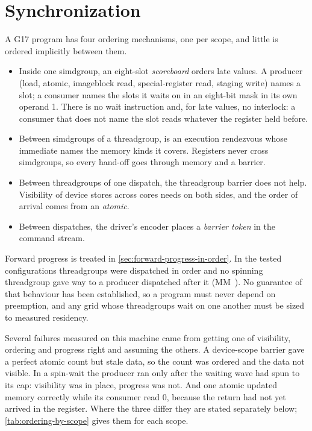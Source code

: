 \chapter{Synchronization}\label{ch:synchronization}

A G17 program has four ordering mechanisms, one per scope, and little is ordered implicitly between them.

\begin{itemize}
\item Inside one simdgroup, an eight-slot \emph{scoreboard} orders late values. A producer (load, atomic, imageblock read,
  special-register read, staging write) names a slot; a consumer names the slots it waits on in an eight-bit mask in
  its own operand 1. There is no wait instruction and, for late values, no interlock: a consumer that does not name the
  slot reads whatever the register held before.
\item Between simdgroups of a threadgroup, \emph{} is an execution rendezvous whose immediate names
  the memory kinds it covers. Registers never cross simdgroups, so every hand-off goes through memory and a barrier.
\item Between threadgroups of one dispatch, the threadgroup barrier does not help. Visibility of device stores
  across cores needs \emph{} on both sides, and the order of arrival comes from an \emph{atomic}.
\item Between dispatches, the driver's encoder places a \emph{barrier token} in the command stream.
\end{itemize}

Forward progress is treated in \cref{sec:forward-progress-in-order}. In the tested configurations threadgroups were
dispatched in order and no spinning threadgroup gave way to a producer dispatched after it (MM~). No
guarantee of that behaviour has been established, so a program must never depend on preemption, and any grid whose
threadgroups wait on one another must be sized to measured residency.

Several failures measured on this machine came from getting one of visibility, ordering and progress right and
assuming the others. A device-scope barrier gave a perfect atomic count but stale data, so the count was ordered and the
data not visible. In a spin-wait the producer ran only after the waiting wave had spun to its cap: visibility was
in place, progress was not. And one atomic updated memory correctly while its consumer read 0, because the return had
not yet arrived in the register. Where the three differ they are stated separately below;
\cref{tab:ordering-by-scope} gives them for each scope.

